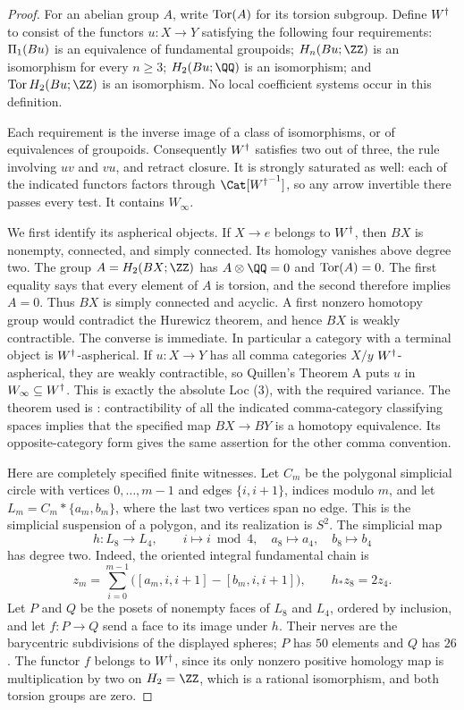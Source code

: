 \begin{proof}
For an abelian group $A$, write $\operatorname{Tor}(A)$ for its torsion subgroup. Define ${W^{\dagger}}$ to consist of the functors $u:X\to Y$ satisfying the following four requirements: $\Pi_1(Bu)$ is an equivalence of fundamental groupoids; $H_n(Bu;\ZZ)$ is an isomorphism for every $n\geq3$; $H_2(Bu;\QQ)$ is an isomorphism; and $\Tor H_2(Bu;\ZZ)$ is an isomorphism. No local coefficient systems occur in this definition.

Each requirement is the inverse image of a class of isomorphisms, or of equivalences of groupoids. Consequently ${W^{\dagger}}$ satisfies two out of three, the rule involving $uv$ and $vu$, and retract closure. It is strongly saturated as well: each of the indicated functors factors through $\Cat[\Wt^{-1}]$, so any arrow invertible there passes every test. It contains $W_\infty$.

We first identify its aspherical objects. If $X\to e$ belongs to ${W^{\dagger}}$, then $BX$ is nonempty, connected, and simply connected. Its homology vanishes above degree two. The group $A=H_2(BX;\ZZ)$ has $A\otimes\QQ=0$ and $\operatorname{Tor}(A)=0$. The first equality says that every element of $A$ is torsion, and the second therefore implies $A=0$. Thus $BX$ is simply connected and acyclic. A first nonzero homotopy group would contradict the Hurewicz theorem, and hence $BX$ is weakly contractible. The converse is immediate. In particular a category with a terminal object is ${W^{\dagger}}$-aspherical. If $u:X\to Y$ has all comma categories $X/y$ ${W^{\dagger}}$-aspherical, they are weakly contractible, so Quillen's Theorem A puts $u$ in $W_\infty\subseteq{W^{\dagger}}$. This is exactly the absolute Loc (3), with the required variance. The theorem used is \cite[\S1, Theorem A]{FGHQuillen1973}: contractibility of all the indicated comma-category classifying spaces implies that the specified map $BX\to BY$ is a homotopy equivalence. Its opposite-category form gives the same assertion for the other comma convention.

Here are completely specified finite witnesses. Let $C_m$ be the polygonal simplicial circle with vertices $0,\ldots,m-1$ and edges $\{i,i+1\}$, indices modulo $m$, and let $L_m=C_m*\{a_m,b_m\}$, where the last two vertices span no edge. This is the simplicial suspension of a polygon, and its realization is $S^2$. The simplicial map
\[
 h:L_8\longrightarrow L_4,
 \qquad i\longmapsto i\bmod4,
 \quad a_8\longmapsto a_4,
 \quad b_8\longmapsto b_4
\]
has degree two. Indeed, the oriented integral fundamental chain is
\[
 z_m=\sum_{i=0}^{m-1}\bigl([a_m,i,i+1]-[b_m,i,i+1]\bigr),
 \qquad h_*z_8=2z_4.
\]
Let $P$ and $Q$ be the posets of nonempty faces of $L_8$ and $L_4$, ordered by inclusion, and let $f:P\to Q$ send a face to its image under $h$. Their nerves are the barycentric subdivisions of the displayed spheres; $P$ has $50$ elements and $Q$ has $26$. The functor $f$ belongs to ${W^{\dagger}}$, since its only nonzero positive homology map is multiplication by two on $H_2=\ZZ$, which is a rational isomorphism, and both torsion groups are zero.


\end{proof}
